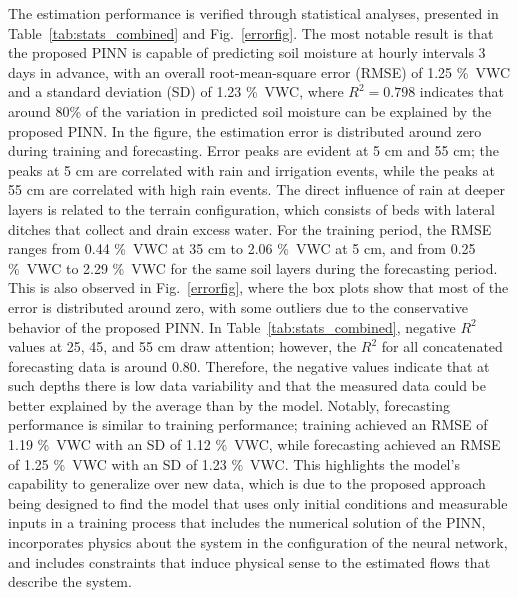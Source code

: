 \documentclass[pdflatex,sn-nature]{sn-jnl}%
\theoremstyle{thmstyleone}%
\theoremstyle{thmstyletwo}%
\theoremstyle{thmstylethree}%
\begin{document}
The estimation performance is verified through statistical analyses, presented in Table~\ref{tab:stats_combined} and Fig.~\ref{errorfig}. The most notable result is that the proposed PINN is capable of predicting soil moisture at hourly intervals 3 days in advance, with an overall root-mean-square error (RMSE) of 1.25 \si{\%VWC} and a standard deviation (SD) of 1.23 \si{\%VWC}, where $R^2=0.798$ indicates that around 80\% of the variation in predicted soil moisture can be explained by the proposed PINN.
In the figure, the estimation error is distributed around zero during training and forecasting. Error peaks are evident at 5 \si{cm} and 55 \si{cm}; the peaks at 5 \si{cm} are correlated with rain and irrigation events, while the peaks at 55 \si{cm} are correlated with high rain events. The direct influence of rain at deeper layers is related to the terrain configuration, which consists of beds with lateral ditches that collect and drain excess water.
For the training period, the RMSE ranges from 0.44 \si{\%VWC} at 35 \si{cm} to 2.06 \si{\%VWC} at 5 \si{cm}, and from 0.25 \si{\%VWC} to 2.29 \si{\%VWC} for the same soil layers during the forecasting period. This is also observed in Fig.~\ref{errorfig}, where the box plots show that most of the error is distributed around zero, with some outliers due to the conservative behavior of the proposed PINN.
In Table~\ref{tab:stats_combined}, negative $R^2$ values at 25, 45, and 55 \si{cm} draw attention; however, the $R^2$ for all concatenated forecasting data is around 0.80. Therefore, the negative values indicate that at such depths there is low data variability and that the measured data could be better explained by the average than by the model. Notably, forecasting performance is similar to training performance; training achieved an RMSE of 1.19 \si{\%VWC} with an SD of 1.12 \si{\%VWC}, while forecasting achieved an RMSE of 1.25 \si{\%VWC} with an SD of 1.23 \si{\%VWC}. This highlights the model's capability to generalize over new data, which is due to the proposed approach being designed to find the model that uses only initial conditions and measurable inputs in a training process that includes the numerical solution of the PINN, incorporates physics about the system in the configuration of the neural network, and includes constraints that induce physical sense to the estimated flows that describe the system.
\end{document}
